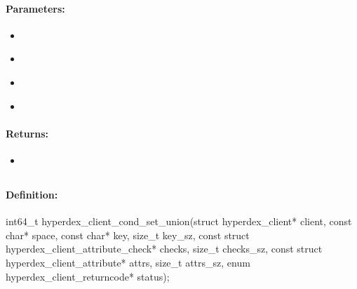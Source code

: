 \paragraph{Parameters:}
\begin{itemize}[noitemsep]
\item {}\\

\item {}\\

\item {}\\

\item {}\\

\end{itemize}

\paragraph{Returns:}
\begin{itemize}[noitemsep]
\item {}\\

\end{itemize}

\pagebreak
\subsection{}
\label{api:c:cond_set_union}


\paragraph{Definition:}
\begin{ccode}
int64_t hyperdex_client_cond_set_union(struct hyperdex_client* client,
        const char* space,
        const char* key, size_t key_sz,
        const struct hyperdex_client_attribute_check* checks, size_t checks_sz,
        const struct hyperdex_client_attribute* attrs, size_t attrs_sz,
        enum hyperdex_client_returncode* status);
\end{ccode}

